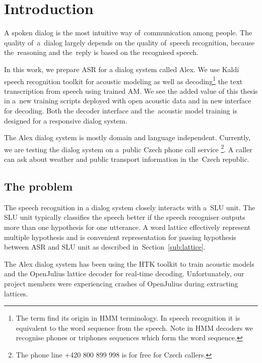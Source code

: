 \chapter{Introduction}
\label{chap:intro}

A spoken dialog is the most intuitive way of~communication among people. 
The quality of~a~dialog largely depends on the quality 
of~speech recognition, because the~reasoning and the~reply is based on the recognised speech. 

In this work, we prepare \acl{ASR} for a dialog system called Alex. 
We use Kaldi\cite{povey2011kaldi} speech recognition toolkit for acoustic modeling 
as well as decoding\footnote{The term  find its origin in \acs{HMM} terminology. In speech recognition it is equivalent to  the word sequence from the speech. Note in HMM decoders we recognise phones or triphones sequences which form the word sequence.} the text transcription from speech using trained \acl{AM}.
We see the added value of this thesis in a~new training scripts deployed with open acoustic data\cite{korvas_2014}
and in new interface for decoding. Both the decoder interface and the~acoustic model training is designed 
for a responsive dialog system. 

The Alex dialog system is mostly domain and language independent.
Currently, we are testing the dialog system on a~public Czech phone call service
\footnote{The phone line +420 800 899 998 is for free for Czech callers.}.
A caller can ask about weather and public transport information in the~Czech republic.

\section{The problem} 
\label{sec:problem}

The speech recognition in a dialog system closely interacts with a~\acl{SLU} unit.
The \ac{SLU} unit typically classifies the speech better 
if the speech recogniser outputs more than one hypothesis for one utterance. 
A word lattice effectively represent multiple hypothesis and is convenient
representation for passing hypothesis between \ac{ASR} and \ac{SLU} unit 
as described in~Section~\ref{sub:lattice}.

The Alex dialog system has been using the \ac{HTK} toolkit\cite{young94htk} 
to train acoustic models and 
the OpenJulius\cite{lee2009julius} lattice decoder for real-time decoding. 
Unfortunately, our project members were experiencing crashes 
of OpenJulius during extracting lattices.

